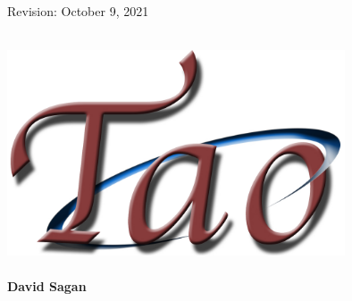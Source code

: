 \thispagestyle{empty}

\begin{flushright}
\large
Revision: October 9, 2021 \\
\end{flushright}

\vfill

{
\begin{center}
 \\
\vskip 0.2in
\includegraphics[width=10cm]{tao-logo.pdf} \\
\vskip 0.3in
 \\
\vskip 0.4in
{\huge \sf\bf David Sagan} \\
\end{center}
}

\vfill
\break
